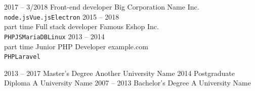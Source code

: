 \documentclass[9pt]{developercv} %
\begin{document}

\begin{entrylist}
	\entry
		{2017 -- 3/2018}
		{Front-end developer}
		{Big Corporation Name Inc.}
		{\lorem \lorem \lorem\\ \texttt{node.js}\slashsep\texttt{Vue.js}\slashsep\texttt{Electron}}
	\entry
		{2015 -- 2018\\\footnotesize{part time}}
		{Full stack developer}
		{Famous Eshop Inc.}
		{\lorem\lorem\\ \texttt{PHP}\slashsep\texttt{JS}\slashsep\texttt{MariaDB}\slashsep\texttt{Linux}}
	\entry
		{2013 -- 2014\\\footnotesize{part time}}
		{Junior PHP Developer}
		{example.com}
		{\lorem\lorem\\ \texttt{PHP}\slashsep\texttt{Laravel}}
\end{entrylist}



\begin{entrylist}
	\entry
		{2013 -- 2017}
		{Master's Degree}
		{Another University Name}
		{\lorem\lorem\lorem}
	\entry
		{2014}
		{Postgraduate Diploma}
		{A University Name}
		{\lorem\lorem}
	\entry
		{2007 -- 2013}
		{Bachelor's Degree}
		{A University Name}
		{\lorem\lorem}
\end{entrylist}


\end{document}

